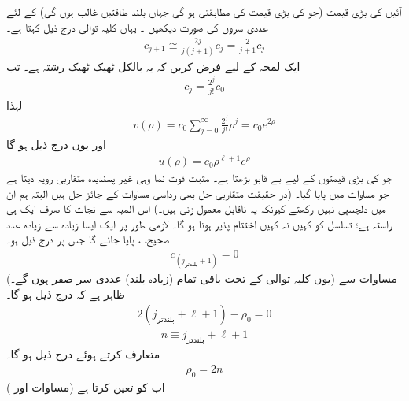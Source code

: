  آئیں  کی بڑی قیمت (جو   کی بڑی قیمت کی مطابقتی ہو گی  جہاں بلند طاقتیں غالب ہوں گی) کے لئے عددی سروں کی صورت دیکھیں ۔ یہاں  کلیہ توالی درج ذیل کہتا ہے۔
\begin{align*}
c_{j+1}\cong\frac{2j}{j(j+1)}c_{j}=\frac{2}{j+1}c_{j} 
\end{align*}
ایک لمحہ کے لیے فرض کریں  کہ یہ بالکل ٹھیک ٹھیک رشتہ ہے۔ تب 
\begin{align}
c_{j}=\frac{2^{j}}{j!}c_{0} 
\end{align}
لہٰذا
\begin{align*}
v(\rho)=c_{0}\sum_{j=0}^{\infty}\frac{2^{j}}{j!}\rho^{j}=c_{0}e^{2\rho} 
\end{align*}
 اور یوں  درج ذیل ہو گا
\begin{align}
u(\rho)=c_{0}\rho^{\ell+1}e^{\rho} 
\end{align}
 جو     کی بڑی قیمتوں کے لیے  بے قابو بڑھتا ہے۔ مثبت قوت نما وہی غیر پسندیدہ متقاربی رویہ دیتا ہے جو مساوات  میں پایا گیا۔ (در حقیقت  متقاربی حل بھی رداسی مساوات کے جائز حل ہیں البتہ ہم ان میں دلچسپی نہیں رکھتے  کیونکہ یہ ناقابل  معمول زنی   ہیں۔) اس المیہ سے نجات کا صرف ایک ہی راستہ ہے؛ تسلسل کو کہیں نہ کہیں اختتام پذیر ہونا ہو گا۔ لازمی طور پر ایک ایسا زیادہ سے زیادہ عدد صحیح، ، پایا جائے گا جس پر درج ذیل ہو۔
 \begin{align}
c_{(j_{\text{بلندتر}}+1)}=0
\end{align}
 (یوں کلیہ توالی کے تحت باقی تمام (زیادہ بلند) عددی سر صفر ہوں گے۔)  مساوات  سے ظاہر ہے کہ درج ذیل ہو گا۔
 \begin{align*}
2(j_{\text{بلندتر}}+\ell+1)-\rho_{0}=0 
\end{align*}
 \begin{align}\label{مساوات_ابعادی_صدر_کوانٹائی_عدد}
n\equiv j_{\text{بلندتر}}+\ell+1 
\end{align}
 متعارف کرتے ہوئے درج ذیل ہو گا۔
 \begin{align}\label{مساوات_ابعادی_رو_این}
\rho_{0}=2n 
\end{align}
 اب  کو    تعین کرتا ہے (مساوات  اور )
